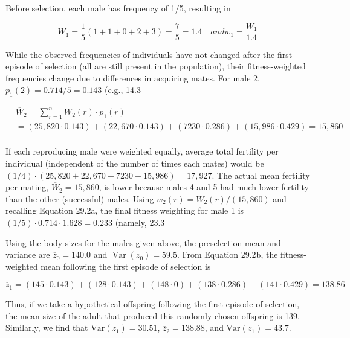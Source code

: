 \documentclass{article}
\begin{document}
Before selection, each male has frequency of 1/5, resulting in

\begin{equation}
\overline{W}_{1}=\frac{1}{5}\left(1+1+0+2+3\right)=\frac{7}{5}=1.4\quad and w_{1}=\frac{W_{1}}{1.4}
\end{equation}

While the observed frequencies of individuals have not changed after the first episode of selection (all are still present in the population), their fitness-weighted frequencies change due to differences in acquiring mates. For male 2,  $ p_1(2) = 0.714/5 = 0.143 $ (e.g., 14.3%

\begin{equation}
\begin{aligned}&\overline{W}_{2}=\sum_{r=1}^{n}W_{2}(r)\cdot p_{1}(r)\\ &=(25,820\cdot0.143)+(22,670\cdot0.143)+(7230\cdot0.286)+(15,986\cdot0.429)=15,860\\ \end{aligned}
\end{equation}

If each reproducing male were weighted equally, average total fertility per individual (independent of the number of times each mates) would be  $ (1/4) \cdot (25,820 + 22,670 + 7230 + 15,986) = 17,927 $. The actual mean fertility per mating,  $ \overline{W}_2 = 15,860 $, is lower because males 4 and 5 had much lower fertility than the other (successful) males. Using  $ w_2(r) = W_2(r) / (15,860) $ and recalling Equation 29.2a, the final fitness weighting for male 1 is  $ (1/5) \cdot 0.714 \cdot 1.628 = 0.233 $ (namely, 23.3%

Using the body sizes for the males given above, the preselection mean and variance are  $ \overline{z}_{0}=140.0 $ and  $ \operatorname{Var}(z_{0})=59.5 $. From Equation 29.2b, the fitness-weighted mean following the first episode of selection is

\begin{equation}
\overline{z}_{1}=(145\cdot0.143)+(128\cdot0.143)+(148\cdot0)+(138\cdot0.286)+(141\cdot0.429)=138.86
\end{equation}

Thus, if we take a hypothetical offspring following the first episode of selection, the mean size of the adult that produced this randomly chosen offspring is 139. Similarly, we find that  $ \mathrm{Var}(z_1) = 30.51 $,  $ \overline{z}_2 = 138.88 $, and  $ \mathrm{Var}(z_1) = 43.7 $.
\end{document}
